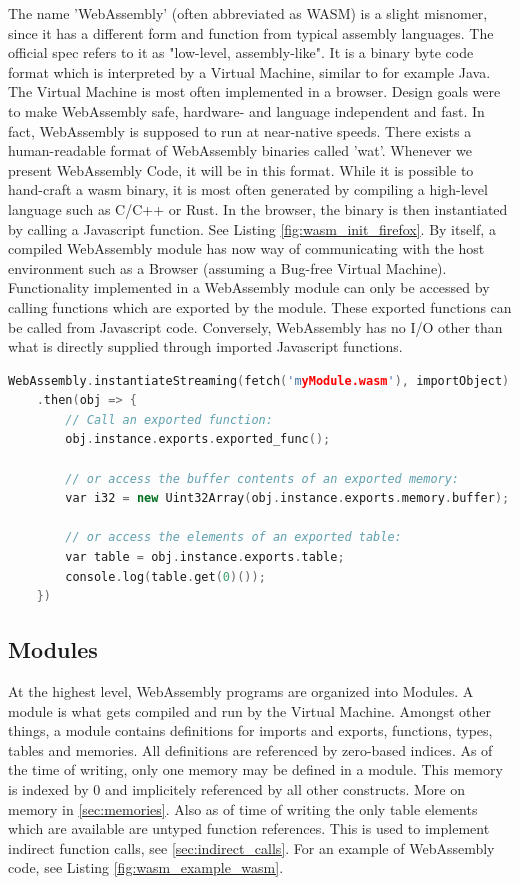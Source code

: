 \documentclass[sigconf]{acmart}
\begin{document}
The name 'WebAssembly' (often abbreviated as WASM) is a slight misnomer, since it has a different form and function from typical assembly languages. The official spec refers to it as "low-level, assembly-like". It is a binary byte code format which is interpreted by a Virtual Machine, similar to for example Java. The Virtual Machine is most often implemented in a browser. Design goals were to make WebAssembly safe, hardware- and language independent and fast. In fact, WebAssembly is supposed to run at near-native speeds. There exists a human-readable format of WebAssembly binaries called 'wat'. Whenever we present WebAssembly Code, it will be in this format. While it is possible to hand-craft a wasm binary, it is most often generated by compiling a high-level language such as C/C++ or Rust. In the browser, the binary is then instantiated by calling a Javascript function. See Listing \ref{fig:wasm_init_firefox}. By itself, a compiled WebAssembly module has now way of communicating with the host environment such as a Browser (assuming a Bug-free Virtual Machine). Functionality implemented in a WebAssembly module can only be accessed by calling functions which are exported by the module. These exported functions can be called from Javascript code. Conversely, WebAssembly has no I/O other than what is directly supplied through imported Javascript functions. 

\begin{lstlisting}[language=C++, caption={How to intantiate a WebAssembly module using Javascript. (\url{https://developer.mozilla.org/en-US/docs/WebAssembly/Loading_and_running}).}, label=fig:wasm_example_c]
	WebAssembly.instantiateStreaming(fetch('myModule.wasm'), importObject)
	.then(obj => {
		// Call an exported function:
		obj.instance.exports.exported_func();

		// or access the buffer contents of an exported memory:
		var i32 = new Uint32Array(obj.instance.exports.memory.buffer);

		// or access the elements of an exported table:
 		var table = obj.instance.exports.table;
		console.log(table.get(0)());
	})
\end{lstlisting}

\subsection{Modules}
At the highest level, WebAssembly programs are organized into Modules.  A module is what gets compiled and run by the Virtual Machine. Amongst other things, a module contains definitions for imports and exports, functions, types, tables and memories. All definitions are referenced by zero-based indices. As of the time of writing, only one memory may be defined in a module. This memory is indexed by 0 and implicitely referenced by all other constructs. More on memory in \ref{sec:memories}. Also as of time of writing the only table elements which are available are untyped function references. This is used to implement indirect function calls, see \ref{sec:indirect_calls}. For an example of WebAssembly code, see Listing \ref{fig:wasm_example_wasm}.
\end{document}
